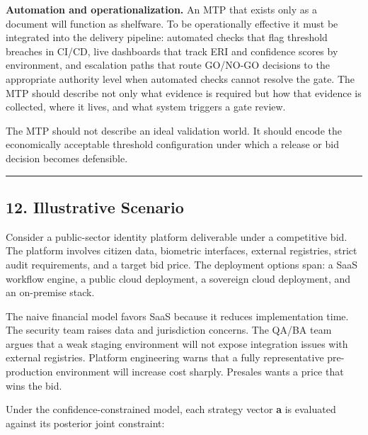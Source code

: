 \documentclass[
]{article}
\begin{document}
\textbf{Automation and operationalization.} An MTP that exists only as a
document will function as shelfware. To be operationally effective it
must be integrated into the delivery pipeline: automated checks that
flag threshold breaches in CI/CD, live dashboards that track ERI and
confidence scores by environment, and escalation paths that route
GO/NO-GO decisions to the appropriate authority level when automated
checks cannot resolve the gate. The MTP should describe not only what
evidence is required but how that evidence is collected, where it lives,
and what system triggers a gate review.

The MTP should not describe an ideal validation world. It should encode
the economically acceptable threshold configuration under which a
release or bid decision becomes defensible.

\begin{center}\rule{0.5\linewidth}{0.5pt}\end{center}

\subsection{12. Illustrative Scenario}\label{illustrative-scenario}

Consider a public-sector identity platform deliverable under a
competitive bid. The platform involves citizen data, biometric
interfaces, external registries, strict audit requirements, and a target
bid price. The deployment options span: a SaaS workflow engine, a public
cloud deployment, a sovereign cloud deployment, and an on-premise stack.

The naive financial model favors SaaS because it reduces implementation
time. The security team raises data and jurisdiction concerns. The QA/BA
team argues that a weak staging environment will not expose integration
issues with external registries. Platform engineering warns that a fully
representative pre-production environment will increase cost sharply.
Presales wants a price that wins the bid.

Under the confidence-constrained model, each strategy vector \textbf{a}
is evaluated against its posterior joint constraint:
\end{document}
